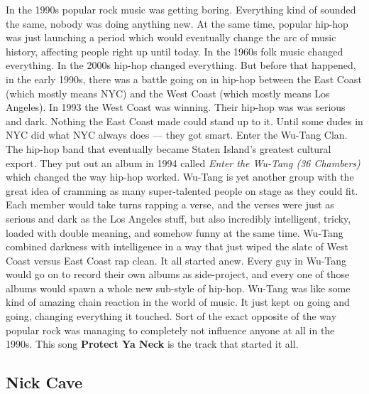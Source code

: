 \documentclass[letterpaper,]{article}
\begin{document}
In the 1990s popular rock music was getting boring. Everything kind of
sounded the same, nobody was doing anything new. At the same time,
popular hip-hop was just launching a period which would eventually
change the arc of music history, affecting people right up until today.
In the 1960s folk music changed everything. In the 2000s hip-hop changed
everything. But before that happened, in the early 1990s, there was a
battle going on in hip-hop between the East Coast (which mostly means
NYC) and the West Coast (which mostly means Los Angeles). In 1993 the
West Coast was winning. Their hip-hop was was serious and dark. Nothing
the East Coast made could stand up to it. Until some dudes in NYC did
what NYC always does --- they got smart. Enter the Wu-Tang Clan. The
hip-hop band that eventually became Staten Island's greatest cultural
export. They put out an album in 1994 called \emph{Enter the Wu-Tang (36
Chambers)} which changed the way hip-hop worked. Wu-Tang is yet another
group with the great idea of cramming as many super-talented people on
stage as they could fit. Each member would take turns rapping a verse,
and the verses were just as serious and dark as the Los Angeles stuff,
but also incredibly intelligent, tricky, loaded with double meaning, and
somehow funny at the same time. Wu-Tang combined darkness with
intelligence in a way that just wiped the slate of West Coast versus
East Coast rap clean. It all started anew. Every guy in Wu-Tang would go
on to record their own albums as side-project, and every one of those
albums would spawn a whole new sub-style of hip-hop. Wu-Tang was like
some kind of amazing chain reaction in the world of music. It just kept
on going and going, changing everything it touched. Sort of the exact
opposite of the way popular rock was managing to completely not
influence anyone at all in the 1990s. This song \textbf{Protect Ya Neck}
is the track that started it all.

\hypertarget{nick-cave}{%
\subsection{Nick Cave}\label{nick-cave}}
\end{document}
